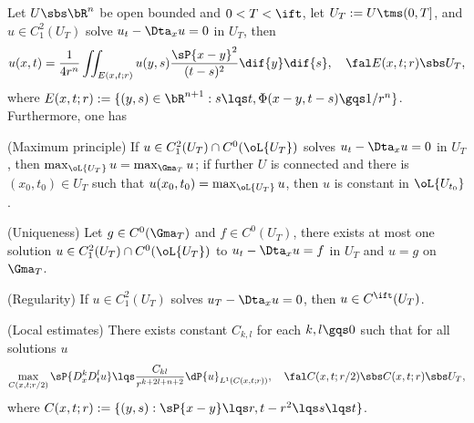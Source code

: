 \documentclass[a4paper, twoside]{article}
\begin{document}
\begin{thm}
    Let $U\sbs\bR^{n}$ be open bounded and $0<T<\ift$, let $U_{T}:=U\tms(0,T]$, and $u\in C_{1}^{2}(U_{T})$ solve $u_{t}-\Dta_{x}u=0$ in $U_{T}$, then
    \[
        u(x,t)=\frac{1}{4r^{n}}\iint_{E(x,t;r)}u(y,s)\frac{\sP{x-y}^{2}}{(t-s)^{2}}\dif{y}\dif{s},\quad \fal E(x,t;r)\sbs U_{T},
    \]
    where $E(x,t;r):=\{(y,s)\in\bR^{n+1}:s\lqs t, \Phi(x-y,t-s)\gqs1/r^{n}\}$. Furthermore, one has
    \begin{itm}
        \item (Maximum principle) If $u\in C_{1}^{2}(U_{T})\cap C^{0}(\oL{U_{T}})$ solves $u_{t}-\Dta_{x}u=0$ in $U_{T}$, then $\max_{\oL{U_{T}}}u=\max_{\Gma_{T}}u$; if further $U$ is connected and there is $(x_{0},t_{0})\in U_{T}$ such that $u(x_{0},t_{0})=\max_{\oL{U_{T}}}u$, then $u$ is constant in $\oL{U_{t_{0}}}$.
        \item (Uniqueness) Let $g\in C^{0}(\Gma_{T})$ and $f\in C^{0}(U_{T})$, there exists at most one solution $u\in C_{1}^{2}(U_{T})\cap C^{0}(\oL{U_{T}})$ to $u_{t}-\Dta_{x}u=f$ in $U_{T}$ and $u=g$ on $\Gma_{T}$.
        \item (Regularity) If $u\in C_{1}^{2}(U_{T})$ solves $u_{T}-\Dta_{x}u=0$, then $u\in C^{\ift}(U_{T})$.
        \item (Local estimates) There exists constant $C_{k,l}$ for each $k,l\gqs0$ such that for all solutions $u$
        \[
            \max_{C(x,t;r/2)}\sP{D_{x}^{k}D_{t}^{l}u}\lqs\frac{C_{kl}}{r^{k+2l+n+2}}\dP{u}_{L^{1}(C(x,t;r))},\quad \fal C(x,t;r/2)\sbs C(x,t;r)\sbs U_{T},
        \]
        where $C(x,t;r):=\{(y,s):\sP{x-y}\lqs r, t-r^{2}\lqs s\lqs t\}$.
    \end{itm}
\end{thm}


\end{document}
